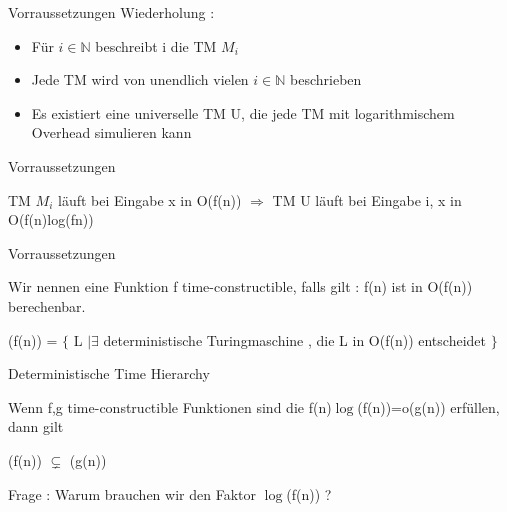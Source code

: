 \begin{frame}{Vorraussetzungen}
	Wiederholung :
	\begin{itemize}
		\item Für $i\in \mathbb{N}$ beschreibt i die TM $M_i$
		\pause
		\item Jede TM wird von unendlich vielen $i\in \mathbb{N}$ beschrieben
		\pause
		\item Es existiert eine universelle TM U, die jede TM mit logarithmischem Overhead 					simulieren kann
	\end{itemize}
\end{frame}
\begin{frame}{Vorraussetzungen}
	\begin{Beispiel}[Universelle TM]
	TM $M_i$ läuft bei Eingabe x in O(f(n))
	$\Rightarrow$ TM U läuft bei Eingabe i, x in O(f(n)log(fn))
	\end{Beispiel}
\end{frame}
\begin{frame}{Vorraussetzungen}
	\begin{Definition}
		Wir nennen eine Funktion f time-constructible, falls gilt : \newline
		f(n) ist in O(f(n)) berechenbar. 
	\end{Definition}
	
	\pause	
	
	\begin{Definition}
		\DTIME(f(n)) = $\lbrace$ L $\vert \exists$ deterministische Turingmaschine ,
		 die L in O(f(n)) entscheidet $\rbrace$
	\end{Definition}
\end{frame}
\begin{frame}{Deterministische Time Hierarchy}
	\begin{Satz}
	Wenn f,g  time-constructible Funktionen sind die  
	f(n)$\log$(f(n))=o(g(n)) erfüllen, dann gilt

		\DTIME(f(n)) $\subsetneq$ \DTIME(g(n))
		
	\end{Satz}
	
	\pause

	Frage : Warum brauchen wir den Faktor $\log$(f(n)) ?
\end{frame}

